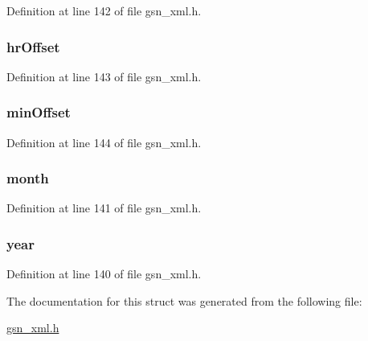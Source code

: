 Definition at line 142 of file gsn\_\-xml.h.

\hypertarget{a00431_aad11de9474bbeeed27b4986d738cf48e}{
\subsubsection[{hrOffset}]{ {\bf hrOffset}}}
\label{a00431_aad11de9474bbeeed27b4986d738cf48e}


Definition at line 143 of file gsn\_\-xml.h.

\hypertarget{a00431_ab33c78dee679b2e12fbc4a8f3ae4c933}{
\subsubsection[{minOffset}]{ {\bf minOffset}}}
\label{a00431_ab33c78dee679b2e12fbc4a8f3ae4c933}


Definition at line 144 of file gsn\_\-xml.h.

\hypertarget{a00431_a9a7060ed27a8fc1c0a801ca792fbc955}{
\subsubsection[{month}]{ {\bf month}}}
\label{a00431_a9a7060ed27a8fc1c0a801ca792fbc955}


Definition at line 141 of file gsn\_\-xml.h.

\hypertarget{a00431_a15cf81be0bc3b33c7cc971ed1a815c74}{
\subsubsection[{year}]{ {\bf year}}}
\label{a00431_a15cf81be0bc3b33c7cc971ed1a815c74}


Definition at line 140 of file gsn\_\-xml.h.



The documentation for this struct was generated from the following file:\begin{DoxyCompactItemize}
\item 
\hyperlink{a00616}{gsn\_\-xml.h}\end{DoxyCompactItemize}
